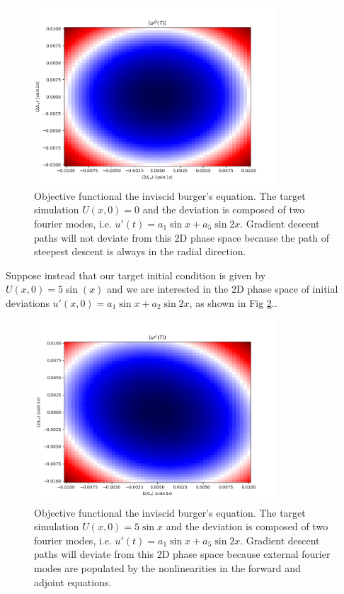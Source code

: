 \documentclass[longbibliography,twocolumn,amsmath,amssymb,aps,nofootinbib]{revtex4-2}
\begin{document}
\begin{figure}[H]
  \includegraphics[width=9cm]{../diffusion/burgobjtest_k1k2_U0.png}
  \caption{Objective functional the inviscid burger's equation. The target simulation $U(x, 0) = 0$ and the deviation is composed of two fourier modes, i.e. $u'(t) = a_1\sin x + a_5\sin 2x$. Gradient descent paths will not deviate from this 2D phase space because the path of steepest descent is always in the radial direction.}
  \label{brgU0}
\end{figure}

Suppose instead that our target initial condition is given by $U(x, 0) = 5\sin(x)$ and we are interested in the 2D phase space of initial deviations $u'(x, 0) = a_1\sin x + a_2 \sin 2x$, as shown in Fig \ref{brgU5m1}.. 

\begin{figure}[H]
  \includegraphics[width=9cm]{../diffusion/burgobjtest_k1k2_U5m1.png}
  \caption{Objective functional the inviscid burger's equation. The target simulation $U(x, 0) = 5\sin x$ and the deviation is composed of two fourier modes, i.e. $u'(t) = a_1\sin x + a_5\sin 2x$. Gradient descent paths will deviate from this 2D phase space because external fourier modes are populated by the nonlinearities in the forward and adjoint equations.}
  \label{brgU5m1}
\end{figure}


\clearpage

\end{document}

